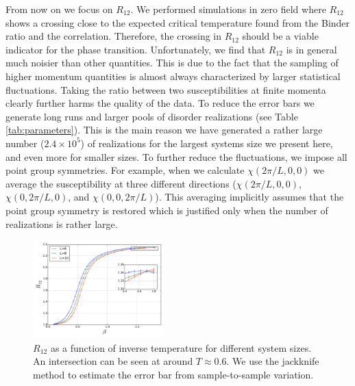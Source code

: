 \documentclass[aps,prb,twocolumn,showpacs,superscriptaddress]{revtex4}
\begin{document}
From now on we focus on $R_{12}$. We performed simulations in zero field
where $R_{12}$ shows a crossing close to the expected critical temperature found from
the Binder ratio and the correlation. Therefore, the crossing in $R_{12}$ should 
be a viable indicator for the phase transition. Unfortunately, we find that $R_{12}$ is in 
general much noisier than other quantities. This is due to the fact that the sampling 
of higher momentum quantities is almost always characterized by larger statistical 
fluctuations. Taking the ratio between two susceptibilities at finite momenta clearly further
harms the quality of the data. To reduce the error bars we generate long runs and larger 
pools of disorder realizations (see Table \ref{tab:parameters}). This is the main reason we have generated a rather large number ($2.4 \times 10^5$) of realizations 
for the largest systems size we present here, and even more for smaller sizes. To further reduce the 
fluctuations, we impose all point group symmetries. For example, when we calculate 
$\chi(2\pi/L,0,0)$ we average the susceptibility at three different directions 
($\chi(2\pi/L,0,0)$, $\chi(0,2\pi/L,0)$, and $\chi(0,0,2\pi/L)$). This averaging implicitly assumes 
that the point group symmetry is restored which is justified only when the number of realizations
is rather large. 
 
\begin{figure}[ht]
\includegraphics[width=0.45\textwidth]{img/r12.pdf}%
\caption{\label{fig:r12} $R_{12}$ as a function of inverse temperature for different system sizes. 
An intersection can be seen at around $T \approx 0.6$. We use the jackknife method to estimate 
the error bar from sample-to-sample variation.  
}
\end{figure}
\end{document}
